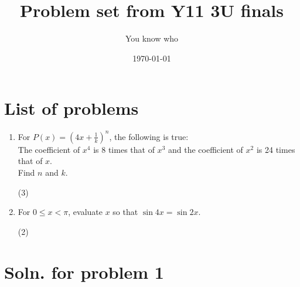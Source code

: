 \documentclass[12pt]{article}
\author{\normalsize You know who}
\title{\huge Problem set from Y11 3U finals}
\date{\today}
\begin{document}
\maketitle
\section*{List of problems}
\large

\begin{enumerate}
	\item For $P(x) = (4x + \frac{1}{k})^n$, the following is true: \\
	      The coefficient of $x^4$ is 8 times that of $x^3$ and the coefficient of $x^2$ is 24 times that of $x$. \\
	      Find $n$ and $k$. \begin{flushright} (3) \end{flushright}

	\item For $0\leq x<\pi$, evaluate $x$ so that $\sin{4x} = \sin{2x}$. \begin{flushright} (2) \end{flushright}
\end{enumerate}

\newpage
\section*{Soln. for problem 1}
\normalsize
\end{document}
